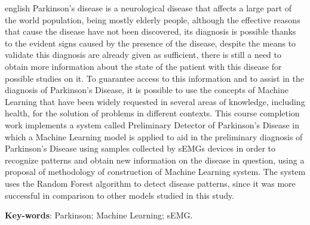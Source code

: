 \begin{resumo}[Abstract]

 \begin{otherlanguage*}{english}
  Parkinson's disease is a neurological disease that affects a large part of the world population, being mostly elderly people, although the effective reasons that cause the disease have not been discovered, its diagnosis is possible thanks to the evident signs caused by the presence of the disease, despite the means to validate this diagnosis are already given as sufficient, there is still a need to obtain more information about the state of the patient with this disease for possible studies on it. To guarantee access to this information and to assist in the diagnosis of Parkinson's Disease, it is possible to use the concepts of Machine Learning that have been widely requested in several areas of knowledge, including health, for the solution of problems in different contexts. This course completion work implements a system called Preliminary Detector of Parkinson's Disease in which a Machine Learning model is applied to aid in the preliminary diagnosis of Parkinson's Disease using samples collected by sEMGs devices in order to recognize patterns and obtain new information on the disease in question, using a proposal of methodology of construction of Machine Learning system. The system uses the Random Forest algorithm to detect disease patterns, since it was more successful in comparison to other models studied in this study.

   \vspace{\onelineskip}
 
   \noindent 
   \textbf{Key-words}: Parkinson; Machine Learning; sEMG.
 \end{otherlanguage*}
\end{resumo}
